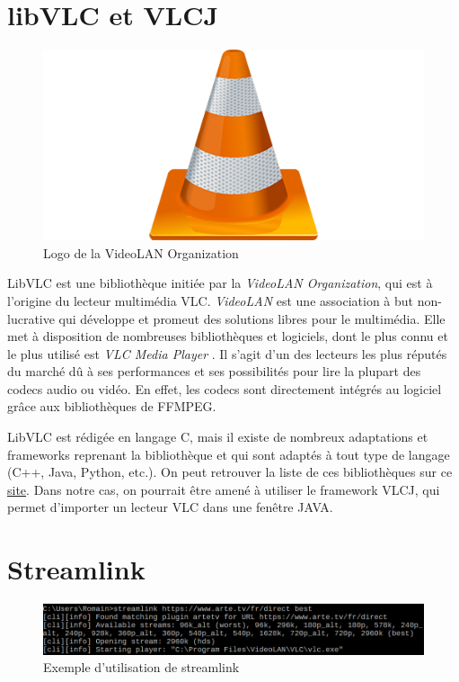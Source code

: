 \documentclass{polytech/polytech}
\begin{document}
\section{libVLC et VLCJ}

\begin{figure}
	\includegraphics[scale=0.5]{images/vlc-media-player-logo}
	\caption{Logo de la VideoLAN Organization}
	\label{fig:logovlc}
\end{figure}

LibVLC est une bibliothèque initiée par la \textit{VideoLAN Organization}, qui est à l’origine du lecteur multimédia VLC. \textit{VideoLAN} est une association à but non-lucrative qui développe et promeut des solutions libres pour le multimédia. Elle met à disposition de nombreuses bibliothèques et logiciels, dont le plus connu et le plus utilisé est \textit{VLC Media Player} \cite{_vlc:_2017}. Il s’agit d’un des lecteurs les plus réputés du marché dû à ses performances et ses possibilités pour lire la plupart des codecs audio ou vidéo. En effet, les codecs sont directement intégrés au logiciel grâce aux bibliothèques de FFMPEG.

LibVLC est rédigée en langage C, mais il existe de nombreux adaptations et frameworks reprenant la bibliothèque et qui sont adaptés à tout type de langage (C++, Java, Python, etc.). On peut retrouver la liste de ces bibliothèques sur ce \href{https://wiki.videolan.org/LibVLC/}{site}. Dans notre cas, on pourrait être amené à utiliser le framework VLCJ, qui permet d’importer un lecteur VLC dans une fenêtre JAVA.


\section{Streamlink}
\label{sec:streamlink}

\begin{figure}
	\includegraphics[scale=0.5]{images/streamlink.png}
	\caption{Exemple d'utilisation de streamlink}
	\label{fig:streamlink}
\end{figure}
\end{document}
